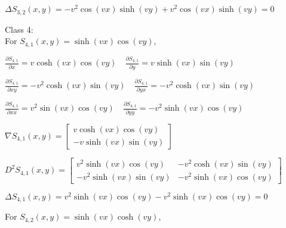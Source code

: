 \documentclass[12pt, executivepaper]{article}
\begin{document}
\begin{flushleft}
\vspace{3mm}

$\Delta S_{3,2}(x,y)=-v^2\cos(vx)\sinh(vy)+v^2\cos(vx)\sinh(vy)=0$

\vspace{5mm}

Class 4: \\

For $S_{4,1}(x,y)=\sinh(vx)\cos(vy)$, \\

\vspace{3mm}

$\frac{\partial S_{4,1}}{\partial x}=v\cosh(vx)\cos(vy) \quad \frac{\partial S_{4,1}}{\partial y}=v\sinh(vx)\sin(vy)$ \\

\vspace{3mm}

$\frac{\partial S_{4,1}}{\partial xy}=-v^2\cosh(vx)\sin(vy) \quad \frac{\partial S_{4,1}}{\partial yx}=-v^2\cosh(vx)\sin(vy)$ \\

\vspace{3mm}

$\frac{\partial S_{4,1}}{\partial xx}=v^2\sin(vx)\cos(vy) \quad \frac{\partial S_{4,1}}{\partial yy}=-v^2\sinh(vx)\cos(vy)$ \\

\vspace{3mm}

$\nabla S_{4,1}(x,y)=
\begin{bmatrix}
v\cosh(vx)\cos(vy) \\
-v\sinh(vx)\sin(vy)
\end{bmatrix}$

\vspace{3mm}

$D^2 S_{4,1}(x,y)=
\begin{bmatrix}
v^2\sinh(vx)\cos(vy) & -v^2\cosh(vx)\sin(vy) \\
-v^2\sinh(vx)\sin(vy) & -v^2\sinh(vx)\cos(vy)
\end{bmatrix}$

\vspace{3mm}

$\Delta S_{4,1}(x,y)=v^2\sinh(vx)\cos(vy)-v^2\sinh(vx)\cos(vy)=0$

\vspace{5mm}

For $S_{4,2}(x,y)=\sinh(vx)\cosh(vy)$, \\

\vspace{3mm}


\end{flushleft}
\end{document}
